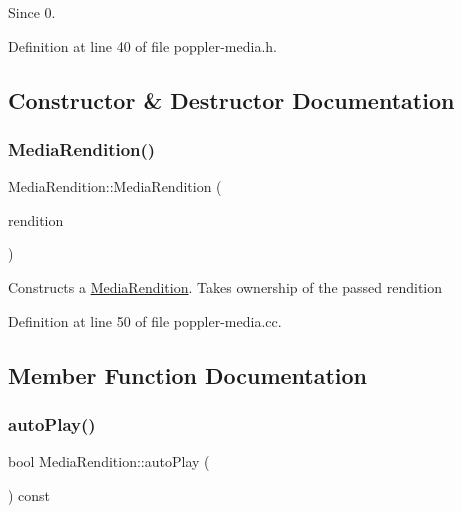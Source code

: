 \begin{DoxySince}{Since}
0. 
\end{DoxySince}


Definition at line 40 of file poppler-\/media.\+h.



\subsection{Constructor \& Destructor Documentation}
\mbox{\label{class_poppler_1_1_media_rendition_abbff4c1b2b2fd57b52ed6bacdf6096e5}} 
\subsubsection{\texorpdfstring{Media\+Rendition()}{MediaRendition()}}
{\footnotesize\ttfamily Media\+Rendition\+::\+Media\+Rendition (\begin{DoxyParamCaption}\item[{\+::\hyperlink{class_poppler_1_1_media_rendition}{Media\+Rendition} $\ast$}]{rendition }\end{DoxyParamCaption})}

Constructs a \hyperlink{class_poppler_1_1_media_rendition}{Media\+Rendition}. Takes ownership of the passed rendition 

Definition at line 50 of file poppler-\/media.\+cc.



\subsection{Member Function Documentation}
\mbox{\label{class_poppler_1_1_media_rendition_a0eb780fdd27b7e5923d3007d105ec2c3}} 
\subsubsection{\texorpdfstring{auto\+Play()}{autoPlay()}}
{\footnotesize\ttfamily bool Media\+Rendition\+::auto\+Play (\begin{DoxyParamCaption}{ }\end{DoxyParamCaption}) const}

